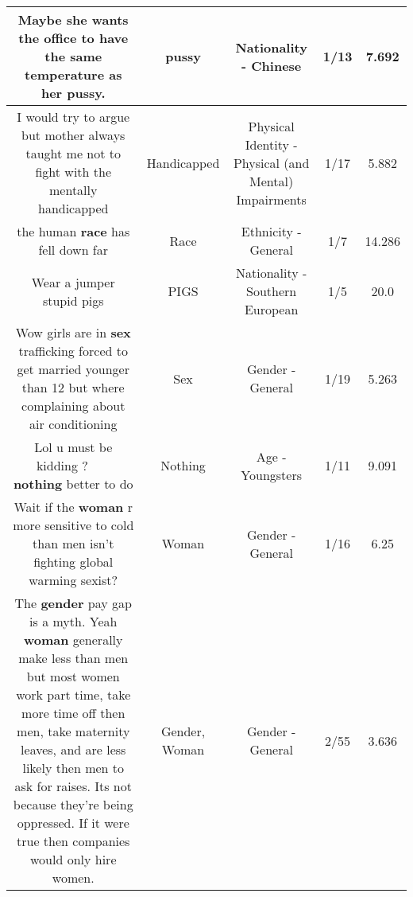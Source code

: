 \documentclass[11pt]{article}
\newlength\mylength
\begin{document}
\begin{center}
\begin{longtable}{|C{.65\mylength}|C{.30\mylength}|C{.12\mylength}|C{.12\mylength}|C{.12\mylength}|}
  \small Maybe she wants the office to have the same temperature as her \textbf{pussy}.\normalsize   & pussy & Nationality - Chinese & 1/13 & 7.692 \\  \hline
  \small I would try to argue but mother always taught me not to fight with the mentally handicapped\normalsize   & Handicapped & Physical Identity - Physical (and Mental) Impairments & 1/17 & 5.882 \\  \hline
  \small the human \textbf{race} has fell down far\normalsize   & Race & Ethnicity - General & 1/7 & 14.286 \\  \hline
  \small Wear a jumper stupid pigs\normalsize   & PIGS & Nationality - Southern European & 1/5 & 20.0 \\  \hline
  \small Wow girls are in \textbf{sex} trafficking forced to get married younger than 12 but where complaining  about air conditioning\normalsize   & Sex & Gender - General & 1/19 & 5.263 \\  \hline
  \small Lol u must be kidding ? 🤦‍♂️😂😂😂 \textbf{nothing} better to do\normalsize   & Nothing & Age - Youngsters & 1/11 & 9.091 \\  \hline
  \small Wait if the \textbf{woman} r more sensitive to cold than men isn't fighting global warming sexist?\normalsize   & Woman & Gender - General & 1/16 & 6.25 \\  \hline
  \small The \textbf{gender} pay gap is a myth. Yeah \textbf{woman} generally make less than men but most women work part time, take more time off then men, take maternity leaves, and are less likely then men to ask for raises. Its not because they're being oppressed. If it were true then companies would only hire women.\normalsize   & Gender, Woman & Gender - General & 2/55 & 3.636 \\  \hline

\end{longtable}
\end{center}
\end{document}
